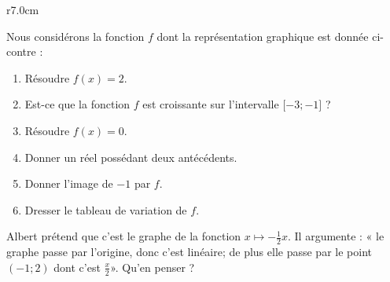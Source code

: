 
\begin{exercice}\label{exosmath-0566}

\begin{wrapfigure}{r}{7.0cm}
   \vspace{-1cm}        %
   \centering
   
\end{wrapfigure}

    Nous considérons la fonction \( f\) dont la représentation graphique est donnée ci-contre :

    \begin{enumerate}
        \item
            Résoudre \( f(x)=2\).
        \item
            Est-ce que la fonction \( f\) est croissante sur l'intervalle \( \mathopen[ -3 ;-1 \mathclose]\) ?
        \item
            Résoudre \( f(x)=0\).
        \item
            Donner un réel possédant deux antécédents.
        \item 
            Donner l'image de \( -1\) par \( f\).
        \item
            Dresser le tableau de variation de \( f\).
    \end{enumerate}
        Albert prétend que c'est le graphe de la fonction \( x\mapsto -\frac{ 1 }{2}x\). Il argumente : « le graphe passe par l'origine, donc c'est linéaire; de plus elle passe par le point \( (-1;2)\) dont c'est \( \frac{ x }{2}\)». Qu'en penser ?

\end{exercice}
